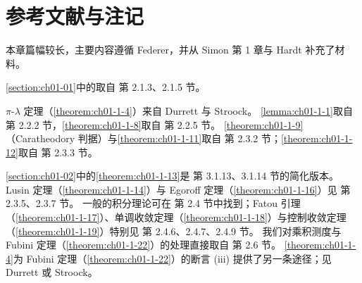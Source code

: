 \documentclass[../../main.tex]{subfiles}%
\begin{document}
\section{参考文献与注记}\label{section:ch01-10}

本章篇幅较长，主要内容遵循 Federer\cite{federer1969}，并从 Simon\cite{simon1984} 第 1 章与 Hardt\cite{hardt1979} 补充了材料。

\cref{section:ch01-01}中的取自\cite{federer1969} 第 2.1.3、2.1.5 节。%

$\pi$-$\lambda$ 定理（\cref{theorem:ch01-1-4}）来自 Durrett\cite{durrett2005} 与 Stroock\cite{stroock1999}。%
\cref{lemma:ch01-1-1}取自\cite{federer1969} 第 2.2.2 节，\cref{theorem:ch01-1-8}取自\cite{federer1969} 第 2.2.5 节。%
\cref{theorem:ch01-1-9}（Caratheodory 判据）与\cref{theorem:ch01-1-11}取自\cite{federer1969} 第 2.3.2 节；\cref{theorem:ch01-1-12}取自\cite{federer1969} 第 2.3.3 节。%

\cref{section:ch01-02}中的\cref{theorem:ch01-1-13}是\cite{federer1969} 第 3.1.13、3.1.14 节的简化版本。%
Lusin 定理（\cref{theorem:ch01-1-14}）与 Egoroff 定理（\cref{theorem:ch01-1-16}）见\cite{federer1969} 第 2.3.5、2.3.7 节。%
一般的积分理论可在\cite{federer1969} 第 2.4 节中找到；Fatou 引理（\cref{theorem:ch01-1-17}）、单调收敛定理（\cref{theorem:ch01-1-18}）与控制收敛定理（\cref{theorem:ch01-1-19}）特别见\cite{federer1969} 第 2.4.6、2.4.7、2.4.9 节。%
我们对乘积测度与 Fubini 定理（\cref{theorem:ch01-1-22}）的处理直接取自\cite{federer1969} 第 2.6 节。%
\cref{theorem:ch01-1-4}为 Fubini 定理（\cref{theorem:ch01-1-22}）的断言 (iii) 提供了另一条途径；见 Durrett\cite{durrett2005} 或 Stroock\cite{stroock1999}。%
\end{document}

